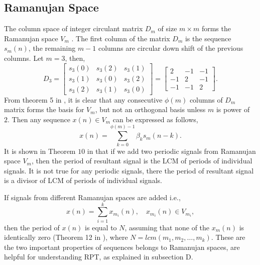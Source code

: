 \documentclass[conference]{IEEEtran}
\begin{document}
\subsection{Ramanujan Space}
The column space of integer circulant matrix $D_m$ of size $m{\times}m$ forms the Ramanujan space $V_m$ \cite{6839014}. The first column of the matrix $D_m$ is the sequence $ s_m(n)$, the remaining $m-1$ columns are circular down shift of the previous columns. Let $m=3$, then,
\begin{equation}
D_3 = \begin{bmatrix}
s_3(0) & s_3(2) & s_3(1) \\
s_3(1) & s_3(0) & s_3(2) \\
s_3(2) & s_3(1) & s_3(0)
\end{bmatrix} = \begin{bmatrix}
2 & -1 & -1 \\
-1 & 2 & -1 \\
-1 & -1 & 2
\end{bmatrix}.
\end{equation}
From theorem 5 in \cite{6839014}, it is clear that any consecutive $\phi(m)$ columns of $D_m$ matrix forms the basis for $V_m$, but 
 not  an orthogonal basis unless $m$ is power of $2.$
Then any sequence $x(n)\in{V_m}$ can be expressed as follows,
\begin{equation}
x(n) = \sum_{k=0}^{\phi{(m)}-1}{\beta}_{k}s_m(n-k).
\end{equation}
It is shown in Theorem $10$ in \cite{6839014} that if we add two periodic signals  from Ramanujan space $V_m$, then the period of 
resultant signal is the LCM of periods of individual signals.  It is not true 
for any periodic signals, there the period of 
resultant signal is a divisor of  LCM of periods of individual signals.

If signals from different Ramanujan spaces are added i.e., 
\begin{equation}
x(n) = \sum_{{i}=1}^{k}{x_{m_i}(n)} ,{\quad}x_{m_i}(n)\in V_{m_i},
\end{equation}
then the period of $x(n)$ is equal to $N$, assuming that none of the $x_m (n)$ is identically zero (Theorem 12 in \cite{6839014}), where $N=lcm(m_1,m_2,\dotsc ,m_k)$. These are the two important properties of sequences belongs to Ramanujan spaces, are helpful for understanding RPT, as explained in subsection D.
\end{document}
